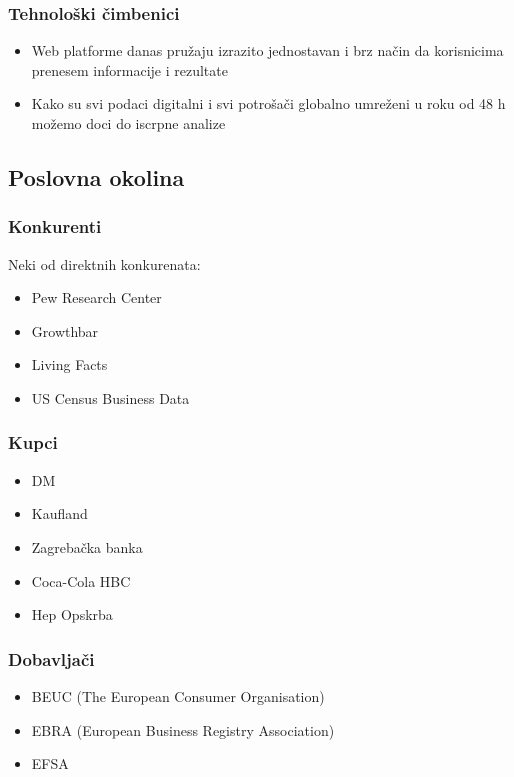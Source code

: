 \documentclass[a4paper]{article}
\begin{document}
	\subsubsection{Tehnološki čimbenici  }

	\begin{itemize}
		\item Web platforme danas pružaju izrazito jednostavan i brz način da korisnicima prenesem informacije i rezultate
		\item Kako su svi podaci digitalni i svi potrošači globalno umreženi u roku od 48 h možemo doci do iscrpne analize
	\end{itemize}

	\subsection{Poslovna okolina }
	\subsubsection{Konkurenti }
	Neki od direktnih konkurenata:
	\begin{itemize}
		\item Pew Research Center
		\item Growthbar
		\item Living Facts
		\item US Census Business Data
	\end{itemize}
	
	\subsubsection{Kupci}
	
	\begin{itemize}
		\item DM
		\item Kaufland
		\item Zagrebačka banka
		\item Coca-Cola HBC
		\item Hep Opskrba
	\end{itemize}
	
	\subsubsection{Dobavljači}
	
	\begin{itemize}
		\item BEUC (The European Consumer Organisation)
		\item EBRA (European Business Registry Association)
		\item EFSA
	\end{itemize}
\end{document}
